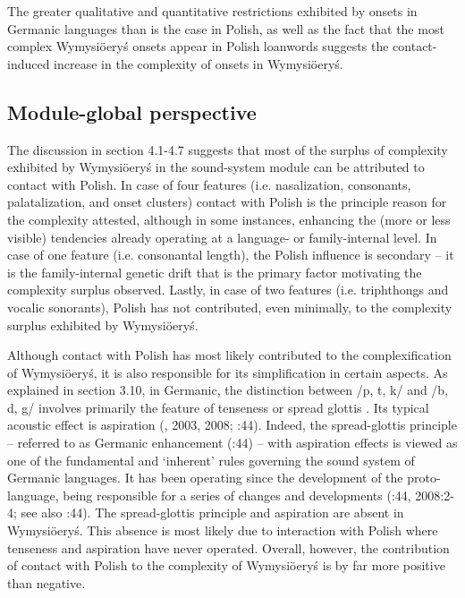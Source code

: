 \documentclass[output=paper]{langscibook}
\begin{document}
The greater qualitative and quantitative restrictions exhibited by onsets in Germanic languages than is the case in Polish, as well as the fact that the most complex Wymysiöeryś onsets appear in Polish loanwords suggests the contact-induced increase in the complexity of onsets in Wymysiöeryś. 

\subsection{Module-global perspective}\label{sec:wymsorys:4.8}

The discussion in section 4.1-4.7 suggests that most of the surplus of complexity exhibited by Wymysiöeryś in the sound-system module can be attributed to contact with Polish. In case of four features (i.e. nasalization, consonants, palatalization, and onset clusters) contact with Polish is the principle reason for the complexity attested, although in some instances, enhancing the (more or less visible) tendencies already operating at a language- or family-internal level. In case of one feature (i.e. consonantal length), the Polish influence is secondary – it is the family-internal genetic drift that is the primary factor motivating the complexity surplus observed. Lastly, in case of two features (i.e. triphthongs and vocalic sonorants), Polish has not contributed, even minimally, to the complexity surplus exhibited by Wymysiöeryś.

Although contact with Polish has most likely contributed to the complexification of Wymysiöeryś, it is also responsible for its simplification in certain aspects. As explained in section 3.10, in Germanic, the distinction between /p, t, k/ and /b, d, g/ involves primarily the feature of tenseness \citep{Jessen1998} or spread glottis \citep[44]{Harbert2007}. Its typical acoustic effect is aspiration (\citealt{IversonSalmons1995,19991995}, 2003, 2008; \citealt{Harbert2007}:44). Indeed, the spread-glottis principle – referred to as Germanic enhancement (\citealt{IversonSalmons2003}:44) – with aspiration effects is viewed as one of the fundamental and ‘inherent’ rules governing the sound system of Germanic languages. It has been operating since the development of the proto-language, being responsible for a series of changes and developments (\citealt{IversonSalmons2003}:44, 2008:2-4; see also \citealt{Harbert2007}:44). The spread-glottis principle and aspiration are absent in Wymysiöeryś. This absence is most likely due to interaction with Polish where tenseness and aspiration have never operated. Overall, however, the contribution of contact with Polish to the complexity of Wymysiöeryś is by far more positive than negative. 
\end{document}
